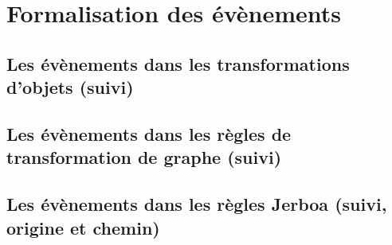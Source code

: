 
\chapter[Formalisation des évènements]{Formalisation des évènements}
\label{cha:formalisation-evenements}

\section[Les évènements dans les transformations d'objets]{Les évènements dans
  les transformations d'objets (suivi)}
\label{sec:formalisation-evenement-transfo-objets}

\section[Les évènements dans les règles de transformation de graphe]{Les
  évènements dans les règles de transformation de graphe (suivi)}
\label{sec:formalisation-evenement-regles-transfo-graphe}

\section[Les évènements dans les règles Jerboa]{Les évènements dans
  les règles Jerboa (suivi, origine et chemin)}
\label{sec:formalisation-evenement-regles-jerboa}

